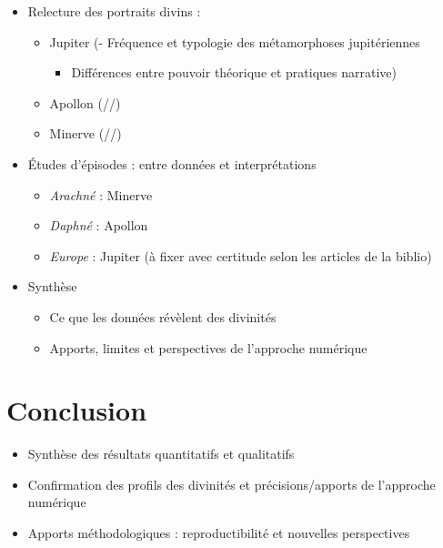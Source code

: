 \documentclass[
  letterpaper,
  DIV=11,
  numbers=noendperiod]{scrreprt}
\providecommand{\tightlist}{%
  \setlength{\itemsep}{0pt}\setlength{\parskip}{0pt}}\usepackage{longtable,booktabs,array}
\begin{document}
\begin{itemize}
\tightlist
\item
  Relecture des portraits divins :

  \begin{itemize}
  \tightlist
  \item
    Jupiter (- Fréquence et typologie des métamorphoses jupitériennes

    \begin{itemize}
    \tightlist
    \item
      Différences entre pouvoir théorique et pratiques narrative)
    \end{itemize}
  \item
    Apollon (//)
  \item
    Minerve (//)
  \end{itemize}
\item
  Études d'épisodes : entre données et interprétations

  \begin{itemize}
  \tightlist
  \item
    \emph{Arachné} : Minerve
  \item
    \emph{Daphné} : Apollon
  \item
    \emph{Europe} : Jupiter (à fixer avec certitude selon les articles
    de la biblio)
  \end{itemize}
\item
  Synthèse

  \begin{itemize}
  \tightlist
  \item
    Ce que les données révèlent des divinités
  \item
    Apports, limites et perspectives de l'approche numérique
  \end{itemize}
\end{itemize}

\section{Conclusion}\label{conclusion}

\begin{itemize}
\tightlist
\item
  Synthèse des résultats quantitatifs et qualitatifs
\item
  Confirmation des profils des divinités et précisions/apports de
  l'approche numérique
\item
  Apports méthodologiques : reproductibilité et nouvelles perspectives
\end{itemize}
\end{document}
